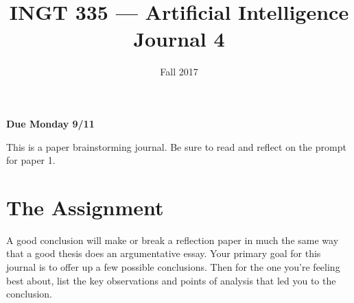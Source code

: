 \documentclass[nobib]{tufte-handout}
\title{INGT 335 --- Artificial Intelligence \\ Journal 4}
\author{}
\date{ Fall 2017 }
\begin{document}
\maketitle

\begin{center}
  \textbf{Due Monday 9/11}
\end{center}

This is a paper brainstorming journal. Be sure to read and reflect on the prompt for paper 1.

\section{The Assignment}

A good conclusion will make or break a reflection paper in much the same way that a good thesis does an argumentative essay. Your primary goal for this journal is to offer up a few possible conclusions. Then for the one you're feeling best  about, list the key observations and points of analysis that led you to the conclusion. 
\end{document}
